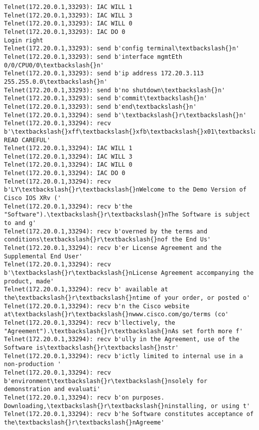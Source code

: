 \documentclass[11pt]{article}
\begin{document}
\begin{Verbatim}[commandchars=\\\{\}]
Telnet(172.20.0.1,33293): IAC WILL 1
Telnet(172.20.0.1,33293): IAC WILL 3
Telnet(172.20.0.1,33293): IAC WILL 0
Telnet(172.20.0.1,33293): IAC DO 0
Login right
Telnet(172.20.0.1,33293): send b'config terminal\textbackslash{}n'
Telnet(172.20.0.1,33293): send b'interface mgmtEth 0/0/CPU0/0\textbackslash{}n'
Telnet(172.20.0.1,33293): send b'ip address 172.20.3.113 255.255.0.0\textbackslash{}n'
Telnet(172.20.0.1,33293): send b'no shutdown\textbackslash{}n'
Telnet(172.20.0.1,33293): send b'commit\textbackslash{}n'
Telnet(172.20.0.1,33293): send b'end\textbackslash{}n'
Telnet(172.20.0.1,33294): send b'\textbackslash{}r\textbackslash{}n'
Telnet(172.20.0.1,33294): recv b'\textbackslash{}xff\textbackslash{}xfb\textbackslash{}x01\textbackslash{}xff\textbackslash{}xfb\textbackslash{}x03\textbackslash{}xff\textbackslash{}xfb\textbackslash{}x00\textbackslash{}xff\textbackslash{}xfd\textbackslash{}x00\textbackslash{}x1b]0;xrv14\textbackslash{}x07\textbackslash{}r\textbackslash{}n\textbackslash{}r\textbackslash{}nIMPORTANT:  READ CAREFUL'
Telnet(172.20.0.1,33294): IAC WILL 1
Telnet(172.20.0.1,33294): IAC WILL 3
Telnet(172.20.0.1,33294): IAC WILL 0
Telnet(172.20.0.1,33294): IAC DO 0
Telnet(172.20.0.1,33294): recv b'LY\textbackslash{}r\textbackslash{}nWelcome to the Demo Version of Cisco IOS XRv ('
Telnet(172.20.0.1,33294): recv b'the "Software").\textbackslash{}r\textbackslash{}nThe Software is subject to and g'
Telnet(172.20.0.1,33294): recv b'overned by the terms and conditions\textbackslash{}r\textbackslash{}nof the End Us'
Telnet(172.20.0.1,33294): recv b'er License Agreement and the Supplemental End User'
Telnet(172.20.0.1,33294): recv b'\textbackslash{}r\textbackslash{}nLicense Agreement accompanying the product, made'
Telnet(172.20.0.1,33294): recv b' available at the\textbackslash{}r\textbackslash{}ntime of your order, or posted o'
Telnet(172.20.0.1,33294): recv b'n the Cisco website at\textbackslash{}r\textbackslash{}nwww.cisco.com/go/terms (co'
Telnet(172.20.0.1,33294): recv b'llectively, the "Agreement").\textbackslash{}r\textbackslash{}nAs set forth more f'
Telnet(172.20.0.1,33294): recv b'ully in the Agreement, use of the Software is\textbackslash{}r\textbackslash{}nstr'
Telnet(172.20.0.1,33294): recv b'ictly limited to internal use in a non-production '
Telnet(172.20.0.1,33294): recv b'environment\textbackslash{}r\textbackslash{}nsolely for demonstration and evaluati'
Telnet(172.20.0.1,33294): recv b'on purposes.  Downloading,\textbackslash{}r\textbackslash{}ninstalling, or using t'
Telnet(172.20.0.1,33294): recv b'he Software constitutes acceptance of the\textbackslash{}r\textbackslash{}nAgreeme'

\end{Verbatim}
\end{document}
